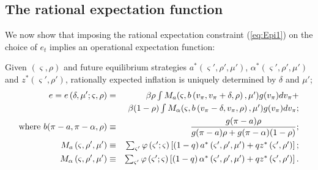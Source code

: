 \documentclass[12pt,letter,leqno]{article}
\theoremstyle{asn}
\theoremstyle{lem}
\theoremstyle{slem}
\theoremstyle{prop}
\theoremstyle{appprop}
\theoremstyle{rem}
\theoremstyle{defn}
\begin{document}
\subsection{The rational expectation function}\label{appsec:consolidate2}

We now show that imposing the rational expectation constraint (\ref{eq:Epi1}) on the choice of $e_t$ implies an operational expectation function:

\begin{slem}\label{lem:eApp}%
Given $\left( \varsigma ,\rho \right) $ and future equilibrium strategies $a^{\ast }\left( \varsigma' ,\rho' ,\mu' \right) $, $%
\alpha ^{\ast }\left( \varsigma' ,\rho' ,\mu' \right) $ and $z^{\ast }\left(
\varsigma' ,\rho' \right) $, rationally expected inflation is uniquely
determined by $\delta$ and $\mu'$;%
\begin{eqnarray}
e =e\left( \delta ,\mu ^{\prime };\varsigma ,\rho \right) &=&\beta \rho \textstyle\int 
M_{a}(\varsigma ,b\left( v_\pi,v_\pi +\delta ,\rho \right) ,\mu ^{\prime })g(v_\pi)
dv_\pi+  \label{app:RE} \\
&&\beta (1-\rho )\textstyle\int M_{\alpha}(\varsigma ,b\left(v_\pi -\delta ,v_\pi ,\rho \right) ,\mu ^{\prime })g(
v_\pi) dv_\pi; \notag\\
\text{where } b(\pi-a,\pi-\alpha,\rho) &\equiv&\frac{g(\pi-a)\rho}{g(\pi-a)\rho+g(\pi-\alpha)(1-\rho)}; \notag \\
M_{a}\left( \varsigma ,\rho ^{\prime },\mu ^{\prime }\right)
&\equiv&\textstyle\sum_{\varsigma ^{\prime }}\varphi \left( \varsigma ^{\prime };\varsigma
\right) \left[ \left( 1-q\right) a^{\ast }\left( \varsigma ^{\prime },\rho
^{\prime },\mu ^{\prime }\right) +qz^{\ast }\left( \varsigma ^{\prime },\rho
^{\prime }\right) \right] ;  \notag\\
M_{\alpha}\left( \varsigma ,\rho ^{\prime },\mu ^{\prime }\right)
&\equiv&\textstyle\sum_{\varsigma ^{\prime }}\varphi \left( \varsigma ^{\prime };\varsigma
\right) \left[ \left( 1-q\right) \alpha ^{\ast }\left( \varsigma ^{\prime
},\rho ^{\prime },\mu ^{\prime }\right) +qz^{\ast }\left( \varsigma ^{\prime
},\rho ^{\prime }\right) \right] .  \notag
\end{eqnarray}%

\end{slem}%
\end{document}
